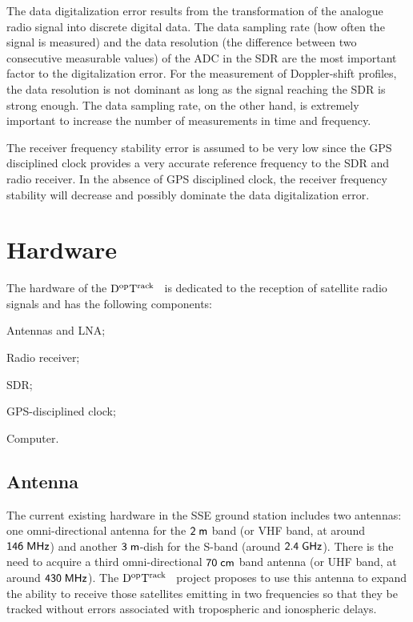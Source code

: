 \documentclass[11pt,a4paper,oneside]{article}
\newcommand{\GroundStationName}{${\rm D^{\rm op}T^{\rm rack}}$}
\newcommand{\listskip}{0pt}
\newenvironment{itemize*}
{\begin{itemize}
  \setlength{\itemsep}{\listskip}
  \setlength{\parskip}{\listskip}
  \setlength{\parsep}{\listskip}}
{\end{itemize}}
\newcommand{\unit}[2]{$ {\sf #1}\thickspace{\sf #2}$}
\begin{document}
The data digitalization error results from the transformation of the analogue radio signal into discrete digital data. The data sampling rate (how often the signal is measured) and the data resolution (the difference between two consecutive measurable values) of the \ac{ADC} in the \ac{SDR} are the most important factor to the digitalization error. For the measurement of Doppler-shift profiles, the data resolution is not dominant as long as the signal reaching the \ac{SDR} is strong enough. The data sampling rate, on the other hand, is extremely important to increase the number of measurements in time and frequency.

The receiver frequency stability error is assumed to be very low since the \ac{GPS} disciplined clock provides a very accurate reference frequency to the \ac{SDR} and radio receiver. In the absence of \ac{GPS} disciplined clock, the receiver frequency stability will decrease and possibly dominate the data digitalization error.



\section{Hardware}

The hardware of the \GroundStationName~ is dedicated to the reception of satellite radio signals and has the following components:

\begin{itemize*}
\item Antennas and \ac{LNA};
\item Radio receiver;
\item \ac{SDR};
\item \ac{GPS}-disciplined clock;
\item Computer.
\end{itemize*}



\subsection{Antenna}


The current existing hardware in the \ac{SSE} ground station includes two antennas: one omni-directional antenna for the \unit{2}{m} band (or \ac{VHF} band, at around \unit{146}{MHz}) and another \unit{3}{m}-dish for the S-band (around \unit{2.4}{GHz}). There is the need to acquire a third omni-directional \unit{70}{cm} band antenna (or \ac{UHF} band, at around \unit{430}{MHz}). The \GroundStationName~ project proposes to use this antenna to expand the ability to receive those satellites emitting in two frequencies so that they be tracked without errors associated with tropospheric and ionospheric delays.
\end{document}
